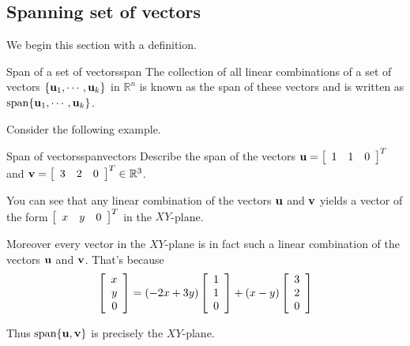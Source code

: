 \subsection{Spanning set of vectors}

We begin this section with a definition.

\begin{definition}{Span of a set of vectors}{span}
The collection of all linear combinations of a set of vectors $\{ {\bf u}_1,
\cdots ,{\bf u}_k\}$ in $\mathbb{R}^{n}$ is known as the span of these
vectors and is written as $\mbox{span} \{{\bf u}_1, \cdots , {\bf u}_k\}$.
\end{definition}

Consider the following example.

\begin{example}{Span of vectors}{spanvectors}
Describe the span of the vectors ${\bf u}=\left[ 
\begin{array}{rrr}
1  & 1 & 0
\end{array}
\right]^T$ and
${\bf v}=\left[ 
\begin{array}{rrr}
3  & 2 & 0
\end{array}
\right]^T \in \mathbb{R}^{3}$.
\end{example}

\begin{solution}
You can see that any linear combination of the vectors ${\bf u}$ and ${\bf v}$ yields a vector of the form 
$\left[ 
\begin{array}{rrr}
x  & y & 0
\end{array}
\right]^T$ in the $XY$-plane. 

Moreover every vector in the $XY$-plane is in fact such a linear
combination of the vectors ${\bf u}$ and ${\bf v}$. That's because
\[ \left[ 
\begin{array}{r}
x \\
y \\
 0
\end{array}
\right] 
=
(-2x+3y) \left[ 
\begin{array}{r}
1  \\
1 \\
0
\end{array}
\right]
+
(x-y)\left[ 
\begin{array}{r}
3 \\
2 \\
0
\end{array}
\right] 
\]

Thus  $\mbox{span}\{{\bf u},{\bf v}\}$ is precisely the $XY$-plane.
\end{solution}

